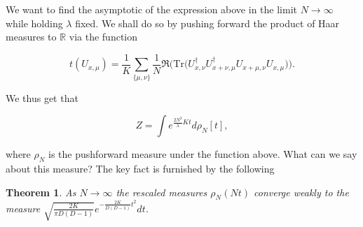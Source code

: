 \documentclass[twoside, a4paper,10pt]{article}
\newcommand{\be}{\begin{equation}}
\newcommand{\ee}{\end{equation}}
\newcommand{\txt}{\textrm}
\newcommand{\tr}{\txt{Tr}}
\newtheorem*{theorem*}{Theorem}
\begin{document}
We want to find the asymptotic of the expression above in the limit $N \to \infty$ while holding $\lambda$ fixed. We shall do so by pushing forward the product of Haar measures to $\mathbb{R}$ via the function 

\be
\label{eq:action}
t(U_{x, \mu}) = \frac{1}{K} \sum_{\{\mu, \nu\}}  \frac{1}{N} \Re \Big ( \tr \big ( U^\dagger_{x, \nu} U^\dagger_{x  + \nu, \mu} U_{x +\mu, \nu} U_{x, \mu}  \big )  \Big ).
\ee

We thus get that 

\be
\label{eq:partition}
Z = \int e^{\frac{2 N^2}{\lambda} K t} d \rho_N[t],
\ee

where $\rho_N$ is the pushforward measure under the function above. What can we say about this measure? The key fact is furnished by the following

\begin{theorem*}
As $N \to \infty$ the rescaled measures $\rho_N(N t)$ converge weakly to the measure $ \sqrt{\frac{2 K}{\pi D (D-1)}} e^{-  \frac{ 2 K}{D (D-1) } t^2} dt$.
\end{theorem*}
\end{document}
